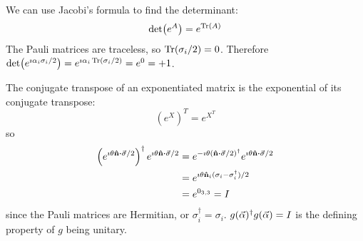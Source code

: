 \documentclass[a4paper,twoside]{article}
\begin{document}
\begin{itemize}
\begin{problem}
            We can use Jacobi's formula to find the determinant:
            \begin{equation}
                \det(e^{A}) = e^{\Tr(A)}
            \end{equation}
            The Pauli matrices are traceless, so $ \Tr(\sigma_i/2) = 0 $. Therefore $ \det(e^{\imath \alpha_i \sigma_i/2}) = e^{\imath \alpha_i \Tr(\sigma_i/2)} = e^{0} = +1 $.

            The conjugate transpose of an exponentiated matrix is the exponential of its conjugate transpose:
            \begin{equation}
                (e^{X})^T = e^{X^T}
            \end{equation}
            so
            \begin{align}
                \left(e^{\imath \theta\vu{ n} \vdot \va{\sigma}/2}\right)^\dagger e^{\imath \theta\vu{ n} \vdot \va{\sigma}/2} &= e^{- \imath \theta(\vu{n} \vdot \va{\sigma}/2)^\dagger} e^{\imath \theta\vu{ n} \vdot \va{\sigma}/2} \\
                &= e^{\imath \theta\vu{ n}_i (\sigma_i - \sigma_i^\dagger)/2} \\
                &= e^{0_{3,3}} = I
            \end{align}
            since the Pauli matrices are Hermitian, or $ \sigma_i^\dagger = \sigma_i $. $ g(\va{\alpha})^\dagger g(\va{\alpha}) = I $ is the defining property of $ g $ being unitary.
        \end{problem}


\end{itemize}
\end{document}
